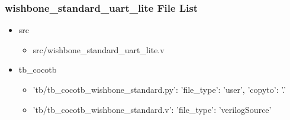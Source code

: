 \subsubsection{wishbone\_standard\_uart\_lite File List}
\begin{itemize}
\item src
	\begin{itemize}
	\item src/wishbone\_standard\_uart\_lite.v
	\end{itemize}
\item tb\_cocotb
	\begin{itemize}
	\item {'tb/tb\_cocotb\_wishbone\_standard.py': {'file\_type': 'user', 'copyto': '.'}}
	\item {'tb/tb\_cocotb\_wishbone\_standard.v': {'file\_type': 'verilogSource'}}
	\end{itemize}
\end{itemize}
